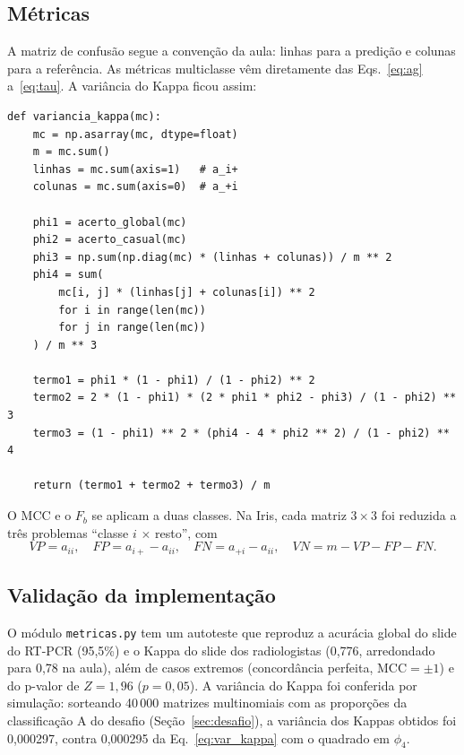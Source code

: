 \documentclass[12pt,a4paper]{article}
\begin{document}
\subsection{Métricas}

A matriz de confusão segue a convenção da aula: linhas para a predição e colunas para a referência. As métricas multiclasse vêm diretamente das Eqs.~\eqref{eq:ag} a~\eqref{eq:tau}. A variância do Kappa ficou assim:

\begin{lstlisting}[title=\texttt{metricas.py} --- variância do Kappa]
def variancia_kappa(mc):
    mc = np.asarray(mc, dtype=float)
    m = mc.sum()
    linhas = mc.sum(axis=1)   # a_i+
    colunas = mc.sum(axis=0)  # a_+i

    phi1 = acerto_global(mc)
    phi2 = acerto_casual(mc)
    phi3 = np.sum(np.diag(mc) * (linhas + colunas)) / m ** 2
    phi4 = sum(
        mc[i, j] * (linhas[j] + colunas[i]) ** 2
        for i in range(len(mc))
        for j in range(len(mc))
    ) / m ** 3

    termo1 = phi1 * (1 - phi1) / (1 - phi2) ** 2
    termo2 = 2 * (1 - phi1) * (2 * phi1 * phi2 - phi3) / (1 - phi2) ** 3
    termo3 = (1 - phi1) ** 2 * (phi4 - 4 * phi2 ** 2) / (1 - phi2) ** 4

    return (termo1 + termo2 + termo3) / m
\end{lstlisting}

O MCC e o $F_b$ se aplicam a duas classes. Na Iris, cada matriz $3 \times 3$ foi reduzida a três problemas ``classe $i$ $\times$ resto'', com
\begin{equation}
  VP = a_{ii},\quad FP = a_{i+} - a_{ii},\quad FN = a_{+i} - a_{ii},\quad VN = m - VP - FP - FN.
  \label{eq:reducao}
\end{equation}

\subsection{Validação da implementação}\label{sec:validacao}

O módulo \texttt{metricas.py} tem um autoteste que reproduz a acurácia global do slide do RT-PCR (95,5\%) e o Kappa do slide dos radiologistas (0,776, arredondado para 0,78 na aula), além de casos extremos (concordância perfeita, $\text{MCC} = \pm 1$) e do p-valor de $Z = 1{,}96$ ($p = 0{,}05$). A variância do Kappa foi conferida por simulação: sorteando 40\,000 matrizes multinomiais com as proporções da classificação A do desafio (Seção~\ref{sec:desafio}), a variância dos Kappas obtidos foi 0,000297, contra 0,000295 da Eq.~\eqref{eq:var_kappa} com o quadrado em $\phi_4$.
\end{document}
